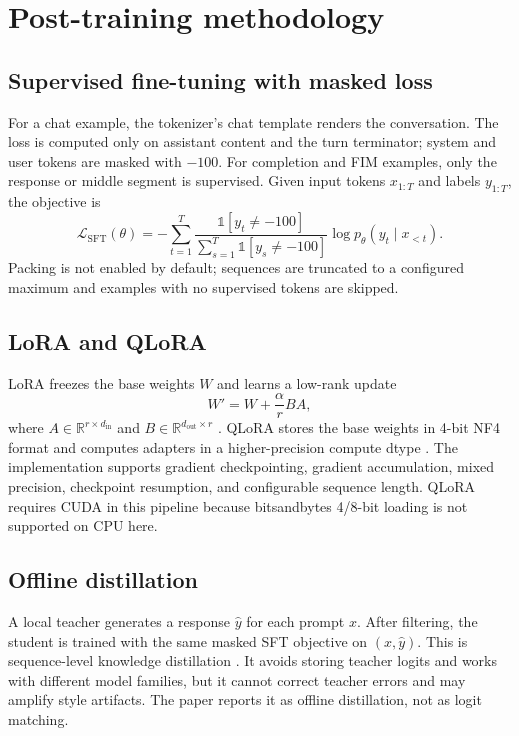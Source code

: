 \section{Post-training methodology}
\label{sec:method}

\subsection{Supervised fine-tuning with masked loss}

For a chat example, the tokenizer's chat template renders the conversation. The
loss is computed only on assistant content and the turn terminator; system and
user tokens are masked with $-100$. For completion and FIM examples, only the
response or middle segment is supervised. Given input tokens $x_{1:T}$ and
labels $y_{1:T}$, the objective is
\begin{equation}
\mathcal{L}_{\mathrm{SFT}}(\theta)
= -\sum_{t=1}^{T} \frac{\mathbb{1}[y_t \neq -100]}{\sum_{s=1}^{T}\mathbb{1}[y_s \neq -100]}
  \log p_\theta(y_t \mid x_{<t}).
\end{equation}
Packing is not enabled by default; sequences are truncated to a configured
maximum and examples with no supervised tokens are skipped.

\subsection{LoRA and QLoRA}

LoRA freezes the base weights $W$ and learns a low-rank update
\begin{equation}
W' = W + \frac{\alpha}{r}BA,
\end{equation}
where $A \in \mathbb{R}^{r \times d_{\mathrm{in}}}$ and
$B \in \mathbb{R}^{d_{\mathrm{out}} \times r}$ \citep{hu2021lora}. QLoRA stores
the base weights in 4-bit NF4 format and computes adapters in a higher-precision
compute dtype \citep{dettmers2023qlora}. The implementation supports gradient
checkpointing, gradient accumulation, mixed precision, checkpoint resumption,
and configurable sequence length. QLoRA requires CUDA in this pipeline because
bitsandbytes 4/8-bit loading is not supported on CPU here.

\subsection{Offline distillation}

A local teacher generates a response $\hat{y}$ for each prompt $x$. After
filtering, the student is trained with the same masked SFT objective on
$(x,\hat{y})$. This is sequence-level knowledge distillation
\citep{hinton2015distillation}. It avoids storing teacher logits and works with
different model families, but it cannot correct teacher errors and may amplify
style artifacts. The paper reports it as offline distillation, not as logit
matching.

